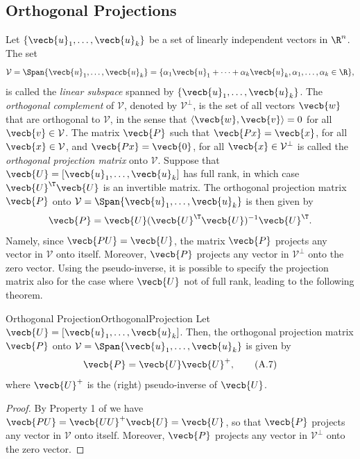 \subsection{Orthogonal Projections}
Let $\{\vecb{u}_1, \dots, \vecb{u}_k\}$ be a set of linearly independent vectors in $\R^n$. The set
\begin{equation*}
	\mathcal{V} = \Span{\vecb{u}_1, \dots, \vecb{u}_k} = \{\alpha_1 \vecb{u}_1 + \dots + \alpha_k \vecb{u}_k, \alpha_1, \dots, \alpha_k \in \R\},
\end{equation*}
is called the \textit{linear subspace} spanned by $\{\vecb{u}_1, \dots, \vecb{u}_k\}$. The \textit{orthogonal complement} of $\mathcal{V}$, denoted by $\mathcal{V}^\perp$, is the set of all vectors $\vecb{w}$ that are orthogonal to $\mathcal{V}$, in the sense that $\langle \vecb{w}, \vecb{v} \rangle = 0$ for all $\vecb{v} \in \mathcal{V}$. The matrix $\vecb{P}$ such that $\vecb{Px} = \vecb{x}$, for all $\vecb{x} \in \mathcal{V}$, and $\vecb{Px} = \vecb{0}$, for all $\vecb{x} \in \mathcal{V}^\perp$ is called the \textit{orthogonal projection matrix} onto $\mathcal{V}$. Suppose that $\vecb{U} = [\vecb{u}_1, \dots, \vecb{u}_k]$ has full rank, in which case $\vecb{U}^\T \vecb{U}$ is an invertible matrix. The orthogonal projection matrix $\vecb{P}$ onto $\mathcal{V} = \Span{\vecb{u}_1, \dots, \vecb{u}_k}$ is then given by
\begin{equation*}
	\vecb{P} = \vecb{U}(\vecb{U}^\T \vecb{U})^{-1}\vecb{U}^\T.
\end{equation*}
Namely, since $\vecb{PU} = \vecb{U}$, the matrix $\vecb{P}$ projects any vector in $\mathcal{V}$ onto itself. Moreover, $\vecb{P}$ projects any vector in $\mathcal{V}^\perp$ onto the zero vector. Using the pseudo-inverse, it is possible to specify the projection matrix also for the case where $\vecb{U}$ not of full rank, leading to the following theorem.

\begin{thm}{Orthogonal Projection}{OrthogonalProjection}
	Let $\vecb{U} = [\vecb{u}_1, \dots, \vecb{u}_k]$. Then, the orthogonal projection matrix $\vecb{P}$ onto $\mathcal{V} = \Span{\vecb{u}_1, \dots, \vecb{u}_k}$ is given by
	\begin{equation}
		\vecb{P} = \vecb{U} \vecb{U}^+, \tag{A.7}
	\end{equation}
	where $\vecb{U}^+$ is the (right) pseudo-inverse of $\vecb{U}$.
\end{thm}

\begin{proof}
	By Property 1 of  we have $\vecb{PU} = \vecb{U U}^+ \vecb{U} = \vecb{U}$, so that $\vecb{P}$ projects any vector in $\mathcal{V}$ onto itself. Moreover, $\vecb{P}$ projects any vector in $\mathcal{V}^\perp$ onto the zero vector.
\end{proof}

